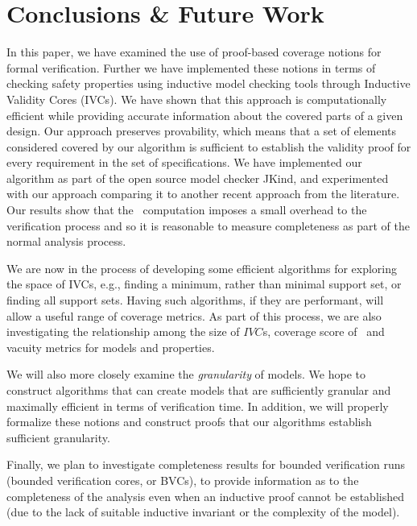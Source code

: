 \section{Conclusions \& Future Work}
\label{sec:conclusion}

In this paper, we have examined the use of proof-based coverage notions for formal verification.
Further we have implemented these notions in terms of checking safety properties using inductive model checking tools through Inductive Validity Cores (IVCs).  We have shown that this approach
is computationally efficient while providing accurate information about the covered parts of a given design.  Our approach preserves provability, which means that a set of elements considered covered by our algorithm is sufficient to establish the validity proof for every requirement in the set of specifications.
%
We have implemented our algorithm as part of the open source model checker JKind, and experimented with our approach comparing it to another recent approach from the literature.  Our results show that the \ucalg\ computation imposes a small overhead to the verification process and so it is reasonable to measure completeness as part of the normal analysis process.

We are now in the process of developing some efficient algorithms for exploring the space of IVCs, e.g., finding a minimum, rather than minimal support set, or finding all support sets.  Having such algorithms, if they are performant, will allow a useful range of coverage metrics.  As part of this process, we are also investigating the relationship among the size of $IVC$s, coverage score of \ivccov\, and vacuity metrics for models and properties.

We will also more closely examine the {\em granularity} of models.  We hope to construct algorithms that can create models that are sufficiently granular and maximally efficient in terms of verification time.  In addition, we will properly formalize these notions and construct proofs that our algorithms establish sufficient granularity.

Finally, we plan to investigate completeness results for bounded verification runs (bounded verification cores, or BVCs), to provide information as to the completeness of the analysis even when an inductive proof cannot be established (due to the lack of suitable inductive invariant or the complexity of the model).

